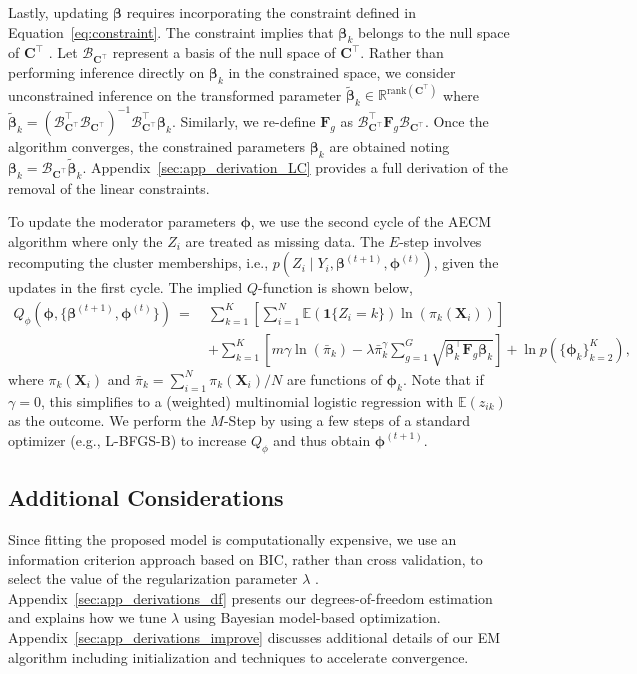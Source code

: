 \documentclass[11pt]{article}
\newcommand\E{\mathbb{E}}
\newcommand\bC{\bm{C}}
\newcommand\bF{\bm{F}}
\newcommand\bX{\bm{X}}
\newcommand\bbeta{\bm{\beta}}
\newcommand\bphi{\bm{\phi}}
\begin{document}
Lastly, updating $\bm{\beta}$ requires incorporating the constraint
defined in Equation~\eqref{eq:constraint}.  The constraint implies
that $\bbeta_k$ belongs to the null space of $\bC^\top$
\citep{lawson1974linear}. Let $\mathcal{B}_{\bC^\top}$ represent a
basis of the null space of $\bC^\top$. Rather than performing
inference directly on $\bbeta_k$ in the constrained space, we consider
unconstrained inference on the transformed parameter
$\tilde{\bbeta}_k \in \mathbb{R}^{\text{rank}(\bC^\top)}$ where
$\tilde{\bbeta}_k=\left(\mathcal{B}_{\bC^\top}^\top
  \mathcal{B}_{\bC^\top}\right)^{-1}
\mathcal{B}_{\bC^\top}^\top\bbeta_k $.  Similarly, we re-define
$\bF_g$ as $\mathcal{B}_{\bC^\top}^\top \bF_g
\mathcal{B}_{\bC^\top}$. Once the algorithm converges, the constrained
parameters $\bbeta_k$ are obtained noting
$\bbeta_k = \mathcal{B}_{\bC^\top}
\tilde{\bbeta}_k$. Appendix~\ref{sec:app_derivation_LC} provides a
full derivation of the removal of the linear constraints.


To update the moderator parameters $\bphi$, we use the second cycle of
the AECM algorithm where only the $Z_i$ are treated as missing
data. The $E$-step involves recomputing the cluster memberships, i.e.,
$p(Z_i \mid Y_i, \bm{\beta}^{(t+1)}, \bm{\phi}^{(t)})$, given the updates in the first
cycle. The implied $Q$-function is shown below,
\begin{align}
\label{eq:aecm_qphi}
Q_{\phi}(\bm{\phi}, \{\bm{\beta}^{(t+1)}, \bm{\phi}^{(t)}\}) \ = \
&\sum_{k=1}^K \left[\sum_{i=1}^N \E(\mathbf{1}\{Z_{i} = k\})\ln(\pi_{k}(\bX_i))\right] \nonumber \\
& + \sum_{k=1}^K \left[m \gamma \ln(\bar{\pi}_k) - \lambda \bar{\pi}_k^\gamma \sum_{g=1}^{G} \sqrt{\bbeta_k^\top \bF_{g} \bbeta_k}\right] + \ln p(\{\bphi_k\}_{k=2}^K),
\end{align}
where $\pi_k(\bX_i)$ and $\bar\pi_k= \sum_{i=1}^N \pi_k(\bX_i)/N$ are
functions of $\bphi_k$.  Note that if $\gamma = 0$, this simplifies to
a (weighted) multinomial logistic regression with $\E(z_{ik})$ as the
outcome. We perform the $M$-Step by using a few steps of a standard
optimizer (e.g., L-BFGS-B) to increase $Q_{\phi}$ and thus obtain
$\bm{\phi}^{(t+1)}$.


\subsection{Additional Considerations}
\label{sec:additional}

Since fitting the proposed model is computationally expensive, we use
an information criterion approach based on BIC, rather than cross
validation, to select the value of the regularization parameter
$\lambda$
\citep{khal:chen:07,khalili2010mixture,chamroukhi2019regularized}. Appendix~\ref{sec:app_derivations_df}
presents our degrees-of-freedom estimation and explains how we tune
$\lambda$ using Bayesian model-based
optimization. Appendix~\ref{sec:app_derivations_improve} discusses
additional details of our EM algorithm including initialization and
techniques to accelerate convergence.
\end{document}
